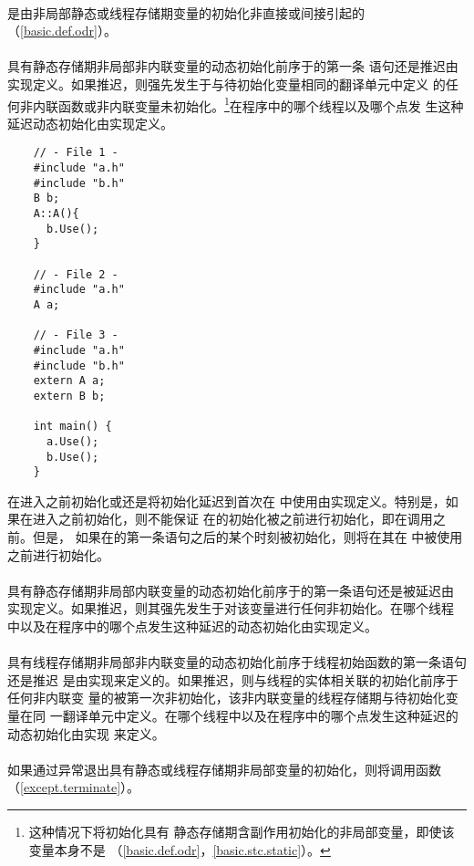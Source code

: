 \paragraph{} %
是由非局部静态或线程存储期变量的初始化非直接或间接引起的
\odruse{}（\ref{basic.def.odr}）。

\paragraph{} %
具有静态存储期非局部非内联变量的动态初始化前序于的第一条
语句还是推迟由实现定义。如果推迟，则强先发生于与待初始化变量相同的翻译单元中定义
的任何非内联函数或非内联变量未初始化\odruse{}。\footnote{这种情况下将初始化具有
静态存储期含副作用初始化的非局部变量，即使该变量本身不是\odrused{}
（\ref{basic.def.odr}，\ref{basic.stc.static}）。}在程序中的哪个线程以及哪个点发
生这种延迟动态初始化由实现定义。


\begin{example}
  \begin{lstlisting}
    // - File 1 -
    #include "a.h"
    #include "b.h"
    B b;
    A::A(){
      b.Use();
    }

    // - File 2 -
    #include "a.h"
    A a;

    // - File 3 -
    #include "a.h"
    #include "b.h"
    extern A a;
    extern B b;

    int main() {
      a.Use();
      b.Use();
    }
  \end{lstlisting}

  在进入之前初始化或还是将初始化延迟到首次在
  中使用由实现定义。特别是，如果在进入之前初始化，则不能保证
  在的初始化被\odruse{}之前进行初始化，即在调用之前。但是，
  如果在的第一条语句之后的某个时刻被初始化，则将在其在
  中被使用之前进行初始化。
\end{example}

\paragraph{} %
具有静态存储期非局部内联变量的动态初始化前序于的第一条语句还是被延迟由
实现定义。如果推迟，则其强先发生于对该变量进行任何非初始化\odruse{}。在哪个线程
中以及在程序中的哪个点发生这种延迟的动态初始化由实现定义。

\paragraph{} %
具有线程存储期非局部非内联变量的动态初始化前序于线程初始函数的第一条语句还是推迟
是由实现来定义的。如果推迟，则与线程的实体相关联的初始化前序于任何非内联变
量的被第一次非初始化\odruse{}，该非内联变量的线程存储期与待初始化变量在同
一翻译单元中定义。在哪个线程中以及在程序中的哪个点发生这种延迟的动态初始化由实现
来定义。

\paragraph{} %
如果通过异常退出具有静态或线程存储期非局部变量的初始化，则将调用函数
（\ref{except.terminate}）。
